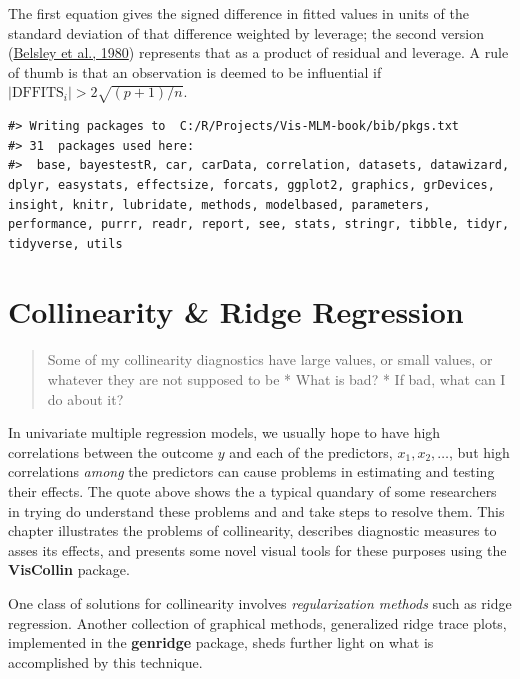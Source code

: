 \documentclass[
  letterpaper,
  10pt,
  krantz2]{krantz}
\begin{document}
The first equation gives the signed difference in fitted values in units
of the standard deviation of that difference weighted by leverage; the
second version (\protect\hyperlink{ref-Belsley-etal:80}{Belsley et al.,
1980}) represents that as a product of residual and leverage. A rule of
thumb is that an observation is deemed to be influential if
\(| \text{DFFITS}_i | > 2 \sqrt{(p+1) / n}\).

\begin{verbatim}
#> Writing packages to  C:/R/Projects/Vis-MLM-book/bib/pkgs.txt
#> 31  packages used here:
#>  base, bayestestR, car, carData, correlation, datasets, datawizard, dplyr, easystats, effectsize, forcats, ggplot2, graphics, grDevices, insight, knitr, lubridate, methods, modelbased, parameters, performance, purrr, readr, report, see, stats, stringr, tibble, tidyr, tidyverse, utils
\end{verbatim}


\hypertarget{sec-collin}{%
\chapter{Collinearity \& Ridge Regression}\label{sec-collin}}

\begin{quote}
Some of my collinearity diagnostics have large values, or small values,
or whatever they are not supposed to be * What is bad? * If bad, what
can I do about it?
\end{quote}

In univariate multiple regression models, we usually hope to have high
correlations between the outcome \(y\) and each of the predictors,
\(x_1, x_2, \dots\), but high correlations \emph{among} the predictors
can cause problems in estimating and testing their effects. The quote
above shows the a typical quandary of some researchers in trying do
understand these problems and and take steps to resolve them. This
chapter illustrates the problems of collinearity, describes diagnostic
measures to asses its effects, and presents some novel visual tools for
these purposes using the \textbf{VisCollin} package.

One class of solutions for collinearity involves \emph{regularization
methods} such as ridge regression. Another collection of graphical
methods, generalized ridge trace plots, implemented in the
\textbf{genridge} package, sheds further light on what is accomplished
by this technique.
\end{document}
